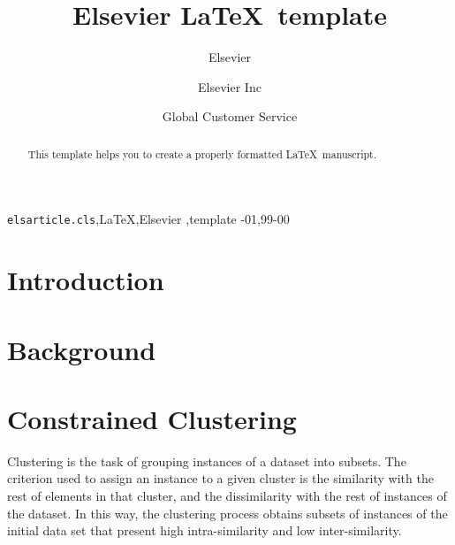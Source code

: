 \documentclass[review]{elsarticle}
\begin{document}
\begin{frontmatter}

\title{Elsevier \LaTeX\ template}

\author{Elsevier}
\address{Radarweg 29, Amsterdam}

\author[mymainaddress,mysecondaryaddress]{Elsevier Inc}

\author[mysecondaryaddress]{Global Customer Service}

\address[mymainaddress]{1600 John F Kennedy Boulevard, Philadelphia}
\address[mysecondaryaddress]{360 Park Avenue South, New York}

\begin{abstract}
This template helps you to create a properly formatted \LaTeX\ manuscript.
\end{abstract}

\begin{keyword}
\texttt{elsarticle.cls}\sep \LaTeX\sep Elsevier \sep template
-01\sep  99-00
\end{keyword}

\end{frontmatter}

\linenumbers

\section{Introduction}

\section{Background}

\section{Constrained Clustering}

Clustering is the task of grouping instances of a dataset into subsets. The criterion used to assign an instance to a given cluster is the similarity with the rest of elements in that cluster, and the dissimilarity with the rest of instances of the dataset. In this way, the clustering process obtains subsets of instances of the initial data set that present high intra-similarity and low inter-similarity.
\end{document}
